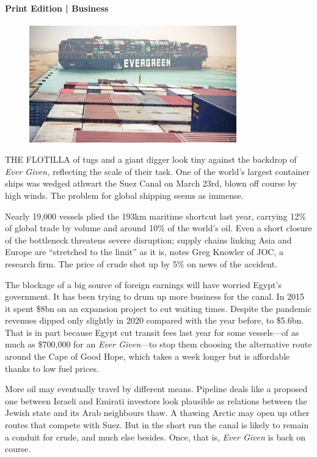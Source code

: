 \documentclass{article}
\begin{document}
\paragraph{Print Edition | Business  \quad \color{gray}{Mar 27th 2021 }}
\begin{figure}[h]
\centering
\includegraphics[width=0.8\textwidth]{images/20210327_WBP001_0.jpg}
\end{figure}
\lettrine{T}HE FLOTILLA of tugs and a giant digger look tiny against the backdrop of \emph{Ever Given,} reflecting the scale of their task. One of the world's largest container ships was wedged athwart the Suez Canal on March 23rd, blown off course by high winds. The problem for global shipping seems as immense. 

Nearly 19,000 vessels plied the 193km maritime shortcut last year, carrying 12\% of global trade by volume and around 10\% of the world's oil. Even a short closure of the bottleneck threatens severe disruption; supply chains linking Asia and Europe are ``stretched to the limit'' as it is, notes Greg Knowler of JOC, a research firm. The price of crude shot up by 5\% on news of the accident. 

The blockage of a big source of foreign earnings will have worried Egypt's government. It has been trying to drum up more business for the canal. In 2015 it spent \$8bn on an expansion project to cut waiting times. Despite the pandemic revenues dipped only slightly in 2020 compared with the year before, to \$5.6bn. That is in part because Egypt cut transit fees last year for some vessels---of as much as \$700,000 for an \emph{Ever Given}---to stop them choosing the alternative route around the Cape of Good Hope, which takes a week longer but is affordable thanks to low fuel prices. 

More oil may eventually travel by different means. Pipeline deals like a proposed one between Israeli and Emirati investors look plausible as relations between the Jewish state and its Arab neighbours thaw. A thawing Arctic may open up other routes that compete with Suez. But in the short run the canal is likely to remain a conduit for crude, and much else besides. Once, that is, \emph{Ever Given} is back on course\emph{.} 
\clearpage
\end{document}

